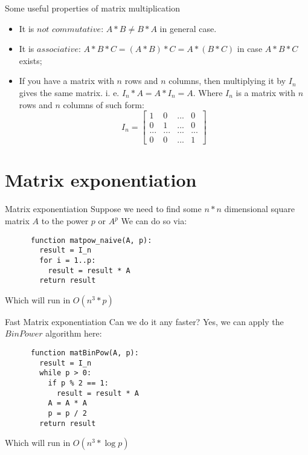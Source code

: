 \documentclass{beamer}
\begin{document}
\begin{frame}{Some useful properties of matrix multiplication}
	\begin{itemize}
	    \item 
    	    It is $not$ $commutative$: $A * B \neq B * A$ in general case.
    	\pause
	    \item
	        It is $associative$: \newline $A * B * C = (A * B) * C = A * (B * C)$ in case $A * B * C$ exists;
        \pause	    
            \item
	        If you have a matrix with $n$ rows and $n$ columns,
	        \newline then multiplying it by $I_n$ gives the same matrix. 
	        \newline i. e. $I_n * A = A * I_n = A$.
	        \pause \newline Where $I_n$ is a matrix with $n$ rows and $n$ columns of such form:
	        \[
	          I_n = 
        	  \left[ {\begin{array}{cccc}
                    1 & 0 & ... & 0 \\
                    0 & 1 & ... & 0 \\
                    ...   &   ...   & ... &   ...   \\
                    0 & 0 & ... & 1
                    \end{array} } 
                  \right]
                \]
	\end{itemize}
\end{frame}

\section{Matrix exponentiation}

\begin{frame}[fragile]{Matrix exponentiation}
    Suppose we need to find some $n*n$ dimensional square matrix $A$ to the power $p$ or $A^p$
    \pause \newline We can do so via:
      \begin{lstlisting}
      function matpow_naive(A, p):
        result = I_n
        for i = 1..p:
          result = result * A
        return result
      \end{lstlisting}
    Which will run in $O(n^3 * p)$
\end{frame}

\begin{frame}[fragile]{Fast Matrix exponentiation}
    Can we do it any faster?
    \pause \newline Yes, we can apply the $BinPower$ algorithm here:
      \begin{lstlisting}
      function matBinPow(A, p):
        result = I_n
        while p > 0:
          if p % 2 == 1:
            result = result * A
          A = A * A
          p = p / 2
        return result
      \end{lstlisting}
    Which will run in $O(n^3 * \log{p})$
\end{frame}
\end{document}
